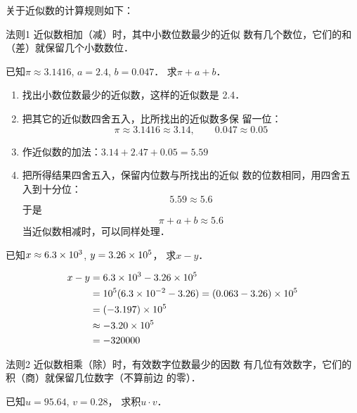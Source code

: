 关于近似数的计算规则如下：
\begin{blk}{法则1}
    近似数相加（减）时，其中小数位数最少的近似
    数有几个数位，它们的和（差）就保留几个小数数位．  
\end{blk}

\begin{example}
    已知$\pi\approx 3.1416$, $a=2.4$, $b=0.047$．
求$\pi+a+b$．
\end{example}    

\begin{solution}
\begin{enumerate}
\item 找出小数位数最少的近似数，这样的近似数是
    2.4．
    \item 把其它的近似数四舍五入，比所找出的近似数多保
    留一位：
    \[\pi\approx 3.1416\approx 3.14,\qquad 0.047\approx 0.05\]
    \item 作近似数的加法：$3.14+2.47+0.05=5.59$
    \item 把所得结果四舍五入，保留内位数与所找出的近似
    数的位数相同，用四舍五入到十分位：
    \[5.59\approx 5.6\]
    于是
    \[\pi+a+b\approx 5.6\]
    当近似数相减时，可以同样处理．
\end{enumerate}
\end{solution}

\begin{example}
已知$x\approx 6.3\times10^3$, $y=3.26\times10^5$，
求$x-y$．
\end{example}
    
    
\begin{solution}
\[\begin{split}
     x-y&=6.3\times10^3-3.26\times10^5\\
&=10^5(6.3\times10^{-2}-3.26)=(0.063-3.26)\times10^5\\
&=(-3.197)\times10^5\\
&\approx -3.20\times 10^5\\
&=-320000
\end{split}\]   
\end{solution}

\begin{blk}{法则2}
近似数相乘（除）时，有效数字位数最少的因数
有几位有效数字，它们的积（商）就保留几位数字（不算前边
的零）．
\end{blk}


\begin{example}
    已知$u=95.64$, $v=0.28$，
求积$u\cdot v$．
\end{example}


